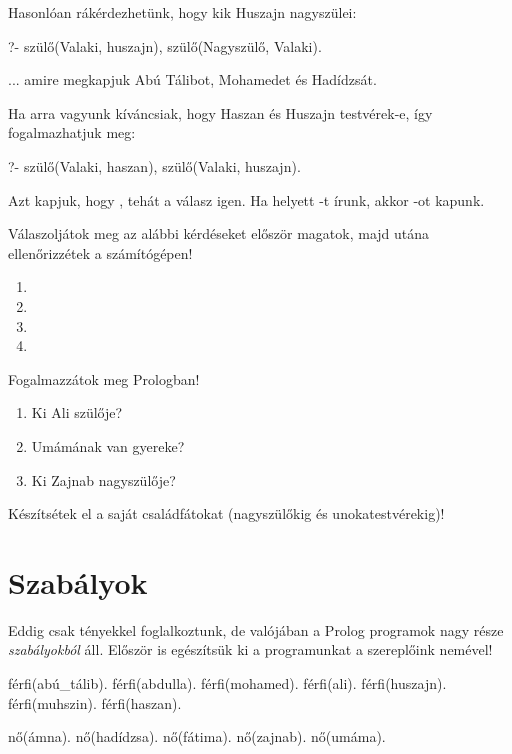 Hasonlóan rákérdezhetünk, hogy kik Huszajn nagyszülei:
\begin{query}
?- szülő(Valaki, huszajn), szülő(Nagyszülő, Valaki).
\end{query}
... amire megkapjuk Abú Tálibot, Mohamedet és Hadídzsát.

Ha arra vagyunk kíváncsiak, hogy Haszan és Huszajn testvérek-e, így fogalmazhatjuk meg:
\begin{query}
?- szülő(Valaki, haszan), szülő(Valaki, huszajn).
\end{query}
Azt kapjuk, hogy , tehát a válasz igen. Ha  helyett -t írunk, akkor -ot kapunk.

\begin{problem}
Válaszoljátok meg az alábbi kérdéseket először magatok, majd utána ellenőrizzétek a számítógépen!
\begin{enumerate}
\item {}
\item {}
\item {}
\item {}
\end{enumerate}
\end{problem}
\begin{problem}
Fogalmazzátok meg Prologban!
\begin{enumerate}
\item Ki Ali szülője?
\item Umámának van gyereke?
\item Ki Zajnab nagyszülője?
\end{enumerate}
\end{problem}
\begin{problem}
Készítsétek el a saját családfátokat (nagyszülőkig
és unokatestvérekig)!
\end{problem}

\section{Szabályok}

Eddig csak tényekkel foglalkoztunk, de valójában a
Prolog programok nagy része \emph{szabályokból}
áll. Először is egészítsük ki a programunkat a
szereplőink nemével!

\begin{program}
férfi(abú_tálib).
férfi(abdulla).
férfi(mohamed).
férfi(ali).
férfi(huszajn).
férfi(muhszin).
férfi(haszan).

nő(ámna).
nő(hadídzsa).
nő(fátima).
nő(zajnab).
nő(umáma).
\end{program}

